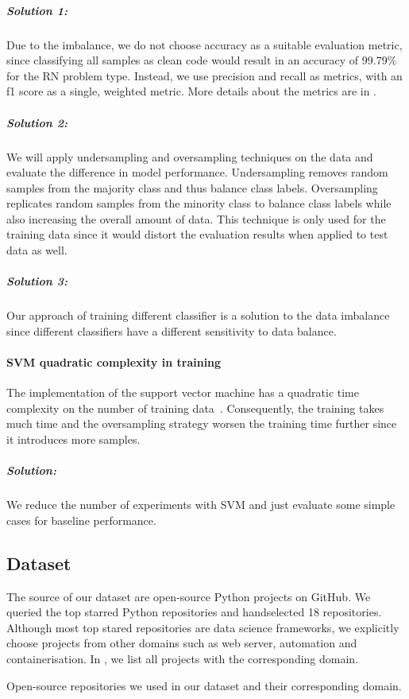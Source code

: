 \subparagraph{Solution 1:}
Due to the imbalance, we do not choose accuracy as a suitable evaluation metric, since classifying all samples as clean code would result in an accuracy of 99.79\% for the RN problem type. Instead, we use precision and recall as metrics, with an f1 score as a single, weighted metric. More details about the metrics are in .

\subparagraph{Solution 2:}
We will apply undersampling and oversampling techniques on the data and evaluate the difference in model performance. Undersampling removes random samples from the majority class and thus balance class labels. Oversampling replicates random samples from the minority class to balance class labels while also increasing the overall amount of data. This technique is only used for the training data since it would distort the evaluation results when applied to test data as well.

\subparagraph{Solution 3:}
Our approach of training different classifier is a solution to the data imbalance since different classifiers have a different sensitivity to data balance. 

\paragraph{SVM quadratic complexity in training}\label{sec:svm_quadratic_complexity}
The implementation of the support vector machine has a quadratic time complexity on the number of training data~\cite{abdiansah_time_2015}. Consequently, the training takes much time and the oversampling strategy worsen the training time further since it introduces more samples.
\subparagraph{Solution:}
We reduce the number of experiments with SVM and just evaluate some simple cases for baseline performance. 


\subsection{Dataset}\label{chap:clean_code_classification_dataset}
The source of our dataset are open-source Python projects on GitHub. We queried the top starred Python repositories and handselected 18 repositories. Although most top stared repositories are data science frameworks, we explicitly choose projects from other domains such as web server, automation and containerisation. In , we list all projects with the corresponding domain.
\begin{table}[h]
    \centering
    \caption{Open-source repositories we used in our dataset and their corresponding domain. }
    \label{tab:repos_domains}
\end{table}

